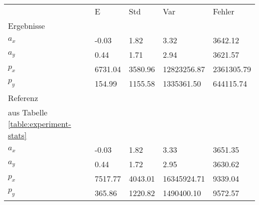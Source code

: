 \begin{tabular}{l|l|l|l|l}

     & E   & Std    & Var    & Fehler \\
\hhline{=|=|=|=|=}

Ergebnisse & & & & \\
$a_x$  &        -0.03 &         1.82 &         3.32 &      3642.12 \\
$a_y$  &         0.44 &         1.71 &         2.94 &      3621.57 \\
$p_x$  &      6731.04 &      3580.96 &  12823256.87 &   2361305.79 \\
$p_y$  &       154.99 &      1155.58 &   1335361.50 &    644115.74 \\

\hline
Referenz & & & & \\
aus Tabelle  \ref{table:experiment-stats} & & & & \\
$a_x$  &        -0.03 &         1.82 &         3.33 &      3651.35 \\
$a_y$  &         0.44 &         1.72 &         2.95 &      3630.62 \\
$p_x$  &      7517.77 &      4043.01 &  16345924.71 &      9339.04 \\
$p_y$  &       365.86 &      1220.82 &   1490400.10 &      9572.57 \\
\end{tabular}
